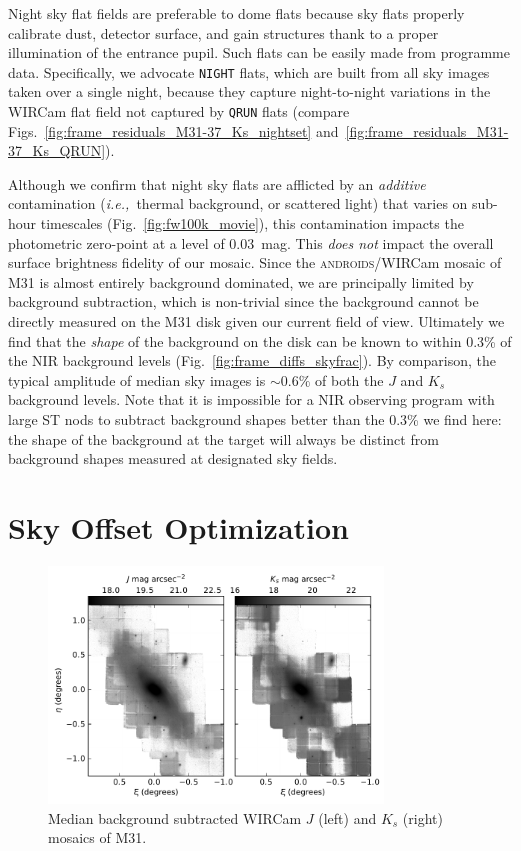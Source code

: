 \documentclass[iop]{emulateapj}
\newcommand{\ie}{\textit{i.e.,~}}
\newcommand{\androids}{\textsc{androids}}
\newcommand{\Fig}[1]{Fig.~\ref{fig:#1}}  %
\begin{document}
Night sky flat fields are preferable to dome flats because sky flats properly calibrate dust, detector surface, and gain structures thank to a proper illumination of the entrance pupil.
Such flats can be easily made from programme data.
Specifically, we advocate \texttt{NIGHT} flats, which are built from all sky images taken over a single night, because they capture night-to-night variations in the WIRCam flat field not captured by \texttt{QRUN} flats (compare Figs.~\ref{fig:frame_residuals_M31-37_Ks_nightset} and~\ref{fig:frame_residuals_M31-37_Ks_QRUN}).

Although we confirm that night sky flats are afflicted by an \emph{additive} contamination (\ie thermal background, or scattered light) that varies on sub-hour timescales (\Fig{fw100k_movie}), this contamination impacts the photometric zero-point at a level of $0.03$~mag. 
This \emph{does not} impact the overall surface brightness fidelity of our mosaic.
Since the \androids /WIRCam mosaic of M31 is almost entirely background dominated, we are principally limited by background subtraction, which is non-trivial since the background cannot be directly measured on the M31 disk given our current field of view.
Ultimately we find that the \emph{shape} of the background on the disk can be known to within 0.3\% of the NIR background levels (\Fig{frame_diffs_skyfrac}).
By comparison, the typical amplitude of median sky images is $\sim 0.6\%$ of both the $J$ and $K_s$ background levels.
Note that it is impossible for a NIR observing program with large ST nods to subtract background shapes better than the 0.3\% we find here: the shape of the background at the target will always be distinct from background shapes measured at designated sky fields.

\section{Sky Offset Optimization}
\label{sec:scalar}

\begin{figure}[t]
\centering
\includegraphics[width=3.5in]{figs/raw_mosaics}
\caption{Median background subtracted WIRCam $J$ (left) and $K_s$ (right) mosaics of M31.}
\label{fig:raw_mosaics}
\end{figure}
\end{document}
